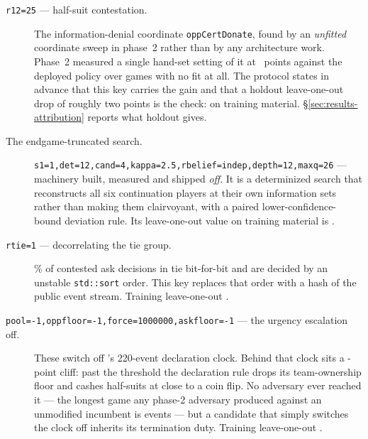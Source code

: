 \begin{description}

\item[\texttt{r12=25} --- half-suit contestation.] The information-denial coordinate
  \texttt{oppCertDonate}, found by an \emph{unfitted} coordinate sweep in phase~2 rather than by any
  architecture work. Phase~2 measured a single hand-set setting of it at \vsevenOneSwitchArm{}~points
  against the deployed policy over \vsevenPhaseTwoCell{} games with no fit at all. The protocol states in advance
  that this key carries the gain and that a holdout leave-one-out drop of roughly two points is the
  check: \vsevenTrainRtwelveLoo{} on training material. \S\ref{sec:results-attribution} reports what
  holdout gives.

\item[The endgame-truncated search.] \texttt{s1=1,det=12,cand=4,kappa=2.5,rbelief=indep,depth=12,maxq=26}
  --- machinery \vsix{} built, measured and shipped \emph{off}. It is a determinized search that
  reconstructs all six continuation players at their own information sets rather than making them
  clairvoyant, with a paired lower-confidence-bound deviation rule. Its leave-one-out value on
  training material is \vsevenTrainSearchLoo{}.

\item[\texttt{rtie=1} --- decorrelating the tie group.] \vsevenTieContested\% of contested ask
  decisions in \vsix{} tie bit-for-bit and are decided by an unstable \texttt{std::sort} order. This
  key replaces that order with a hash of the public event stream. Training leave-one-out
  \vsevenTrainRtieLoo{}.

\item[\texttt{pool=-1,oppfloor=-1,force=1000000,askfloor=-1} --- the urgency escalation off.] These
  switch off \vfive{}'s 220-event declaration clock. Behind that clock sits a
  \vsevenCliff-point cliff: past the threshold the declaration rule drops its team-ownership floor and
  cashes half-suits at close to a coin flip. No adversary ever reached it --- the longest game any
  phase-2 adversary produced against an unmodified incumbent is \vsevenCliffIncumbentTail{} events ---
  but a candidate that simply switches the clock off inherits its termination duty. Training
  leave-one-out \vsevenTrainUrgoffLoo{}.


\end{description}
